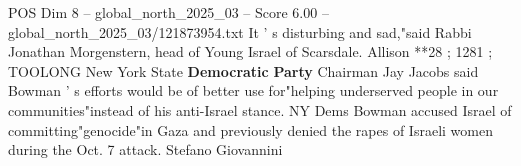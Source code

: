 \begin{textsample}{POS Dim 8 – global\_north\_2025\_03 – Score 6.00 – global\_north\_2025\_03/121873954.txt}
It ' s disturbing and sad,"said Rabbi Jonathan Morgenstern, head of Young Israel of Scarsdale.
Allison **28 ; 1281 ; TOOLONG New York State \textbf{Democratic} \textbf{Party} Chairman Jay Jacobs said Bowman ' s efforts would be of better use for"helping underserved people in our communities"instead of his anti-Israel stance.
NY Dems Bowman accused Israel of committing"genocide"in Gaza and previously denied the rapes of Israeli women during the Oct. 7 attack.
Stefano Giovannini

\end{textsample}
